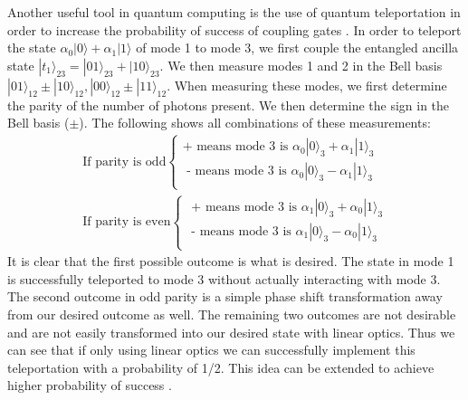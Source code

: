 \documentclass[aps,pra,twocolumn,amsmath,amssymb,nofootinbib,superscriptaddress]{revtex4}
\newcommand{\ket}[1]{|#1\rangle}
\begin{document}
Another useful tool in quantum computing is the use of quantum teleportation in order to increase the probability of success of coupling gates \cite{knill}. In order to teleport the state $\alpha_0 \ket{0} + \alpha_1 \ket{1}$ of mode 1 to mode 3, we first couple the entangled ancilla state $\ket{t_1}_{23} = \ket{01}_{23} + \ket{10}_{23}$. We then measure modes 1 and 2 in the Bell basis $\ket{01}_{12} \pm \ket{10}_{12}, \ket{00}_{12} \pm \ket{11}_{12}$. When measuring these modes, we first determine the parity of the number of photons present. We then determine the sign in the Bell basis ($\pm$). The following shows all combinations of these measurements:
\begin{eqnarray}
\textrm{If parity is odd} \left \{
\begin{array}{c}
\textrm{+ means mode 3 is  } \alpha_0 \ket{0}_3 + \alpha_1 \ket{1}_3  \\
\textrm{ - means mode 3 is  } \alpha_0 \ket{0}_3 - \alpha_1 \ket{1}_3 \\
\end{array} \right . \nonumber\\
\textrm{If parity is even} \left \{
\begin{array}{c}
\textrm{ + means mode 3 is  } \alpha_1 \ket{0}_3 + \alpha_0 \ket{1}_3 \\
\textrm{  - means mode 3 is  } \alpha_1 \ket{0}_3 - \alpha_0 \ket{1}_3 \\
\end{array} \right . \nonumber
\end{eqnarray}
 It is clear that the first possible outcome is what is desired. The state in mode 1 is successfully teleported to mode 3 without actually interacting with mode 3. The second outcome in odd parity is a simple phase shift transformation  away from our desired outcome as well. The remaining two outcomes are not desirable and are not easily transformed into our desired state with linear optics. Thus we can see that if only using linear optics we can successfully implement this teleportation with a probability of 1/2. This idea can be extended to achieve higher probability of success \cite{knill}.
\end{document}
